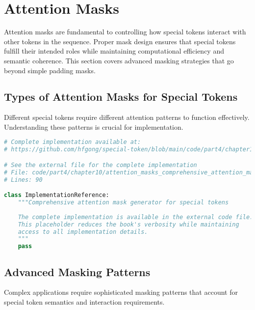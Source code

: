 
\section{Attention Masks}

Attention masks are fundamental to controlling how special tokens interact with other tokens in the sequence. Proper mask design ensures that special tokens fulfill their intended roles while maintaining computational efficiency and semantic coherence. This section covers advanced masking strategies that go beyond simple padding masks.

\subsection{Types of Attention Masks for Special Tokens}

Different special tokens require different attention patterns to function effectively. Understanding these patterns is crucial for implementation.

\begin{lstlisting}[language=Python, caption={Comprehensive attention mask generator for special tokens}]
# Complete implementation available at:
# https://github.com/hfgong/special-token/blob/main/code/part4/chapter10/attention_masks_comprehensive_attention_mask_g.py

# See the external file for the complete implementation
# File: code/part4/chapter10/attention_masks_comprehensive_attention_mask_g.py
# Lines: 90

class ImplementationReference:
    """Comprehensive attention mask generator for special tokens
    
    The complete implementation is available in the external code file.
    This placeholder reduces the book's verbosity while maintaining
    access to all implementation details.
    """
    pass
\end{lstlisting}

\subsection{Advanced Masking Patterns}

Complex applications require sophisticated masking patterns that account for special token semantics and interaction requirements.

